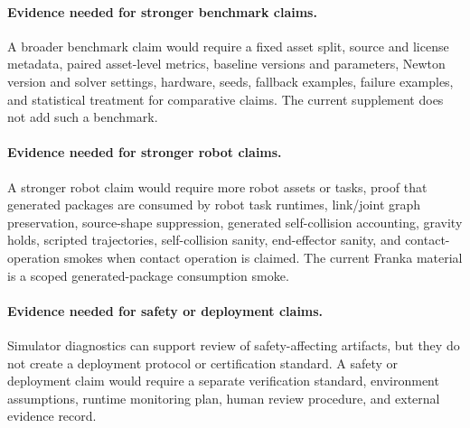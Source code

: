 \paragraph{Evidence needed for stronger benchmark claims.}
A broader benchmark claim would require a fixed asset split, source and license metadata, paired
asset-level metrics, baseline versions and parameters, Newton version and solver settings,
hardware, seeds, fallback examples, failure examples, and statistical treatment for comparative
claims. The current supplement does not add such a benchmark.

\paragraph{Evidence needed for stronger robot claims.}
A stronger robot claim would require more robot assets or tasks, proof that generated packages are
consumed by robot task runtimes, link/joint graph preservation, source-shape suppression, generated
self-collision accounting, gravity holds, scripted trajectories, self-collision sanity,
end-effector sanity, and contact-operation smokes when contact operation is claimed. The current
Franka material is a scoped generated-package consumption smoke.

\paragraph{Evidence needed for safety or deployment claims.}
Simulator diagnostics can support review of safety-affecting artifacts, but they do not create a
deployment protocol or certification standard. A safety or deployment claim would require a
separate verification standard, environment assumptions, runtime monitoring plan, human review
procedure, and external evidence record.

